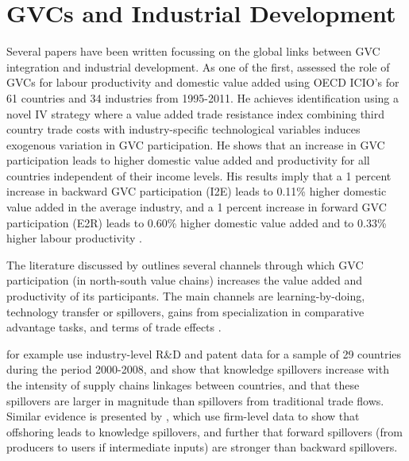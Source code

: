 \documentclass[a4paper]{article}
\begin{document}
\section{GVCs and Industrial Development}
Several papers have been written focussing on the global links between GVC integration and industrial development. As one of the first, \citet{Kummritz20161} assessed the role of GVCs for labour productivity and domestic value added using OECD ICIO's for 61 countries and 34 industries from 1995-2011. He achieves identification using a novel IV strategy where a value added trade resistance index combining third country trade costs with industry-specific technological variables induces exogenous variation in GVC participation. He shows that an increase in GVC participation leads to higher domestic value added and productivity for all countries independent of their income levels. His results imply that a 1 percent increase in backward GVC participation (I2E) leads to 0.11\% higher domestic value added in the average industry, and  a 1 percent increase in forward GVC participation (E2R) leads to 0.60\% higher domestic value added and to 0.33\% higher labour productivity \citep{Kummritz20161}. \newline


The literature discussed by \citet{Kummritz20161} outlines several channels through which GVC participation (in north-south value chains) increases the value added and productivity of its participants. The main channels are learning-by-doing, technology transfer or spillovers, gains from specialization in comparative advantage tasks, and terms of trade effects  \citep{Kummritz20161}. \newline

\citet{piermartini2014knowledge} for example use industry-level R\&D and patent data for a sample of 29 countries during the period 2000-2008, and show that knowledge spillovers increase with the intensity of supply chains linkages between countries, and that these spillovers are larger in magnitude than spillovers from traditional trade flows. Similar evidence is presented by \citet{benz2015trade}, which use firm-level data to show that offshoring leads to knowledge spillovers, and further that forward spillovers (from producers to users if intermediate inputs) are stronger than backward spillovers. \newline
\end{document}
